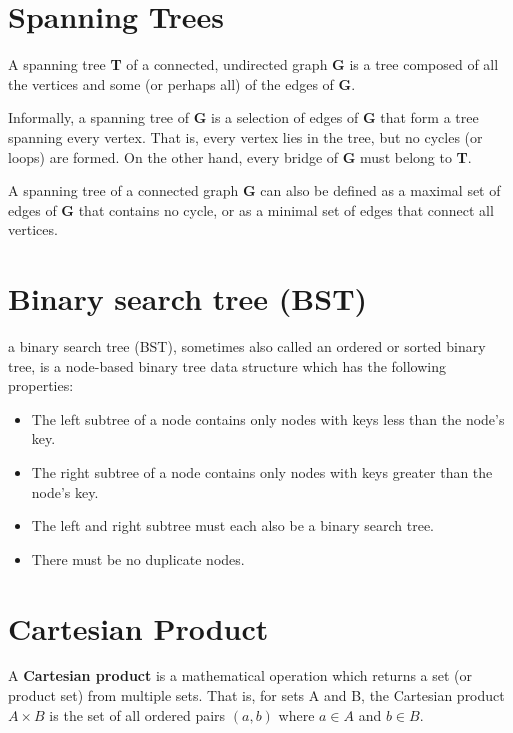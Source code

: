 
		

\section{Spanning Trees}
A spanning tree \textbf{T} of a connected, undirected graph \textbf{G} is a tree composed of all the vertices and some (or perhaps all) of the edges of \textbf{G}. 

Informally, a spanning tree of \textbf{G} is a selection of edges of \textbf{G} that form a tree spanning every vertex. That is, every vertex lies in the tree, but no cycles (or loops) are formed. On the other hand, every bridge of \textbf{G} must belong to \textbf{T}.

A spanning tree of a connected graph \textbf{G} can also be defined as a maximal set of edges of \textbf{G} that contains no cycle, or as a minimal set of edges that connect all vertices.


\section{Binary search tree (BST)}
a binary search tree (BST), sometimes also called an ordered or sorted binary tree, is a node-based binary tree data structure which has the following properties:

\begin{itemize}
\item The left subtree of a node contains only nodes with keys less than the node's key.
\item The right subtree of a node contains only nodes with keys greater than the node's key.
\item The left and right subtree must each also be a binary search tree.
\item There must be no duplicate nodes.
\end{itemize}

\section{Cartesian Product}
 A \textbf{Cartesian product} is a mathematical operation which returns a set (or product set) from multiple sets. That is, for sets A and B, the Cartesian product $A \times B$ is the set of all ordered pairs $(a, b)$ where $a \in A$ and $b \in B$.


